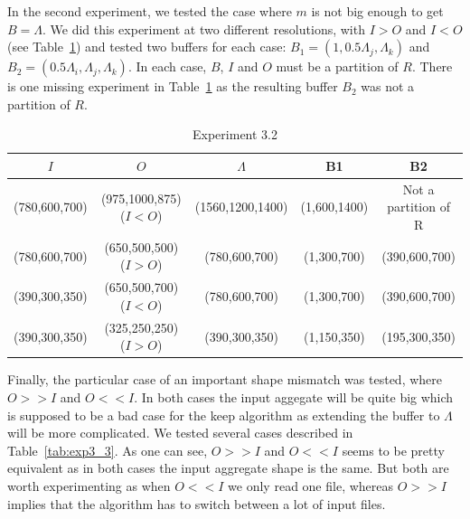 \documentclass[conference]{IEEEtran}
\begin{document}
In the second experiment, we tested the case where $m$ is not big enough to get
$B=\Lambda$. We did this experiment at two different resolutions, with $I>O$
and $I<O$ (see Table~\ref{tab:exp3_2}) and tested two buffers for each case:
$B_1=(1,0.5\Lambda_j,\Lambda_k)$ and $B_2=(0.5\Lambda_i,\Lambda_j,\Lambda_k)$.
In each case, $B$, $I$ and $O$ must be a partition of $R$. There is one missing
experiment in Table~\ref{tab:exp3_2} as the resulting buffer $B_2$ was not a
partition of $R$.

\begin{table}[ht]
 \centering
 \caption{Experiment 3.2}

  \begin{tabular}[t]{c c c c c}
  \hline
    $I$ & $O$ & $\Lambda$ & B1 & B2 \\
    \hline\hline
    (780,600,700) & (975,1000,875) ($I<O$) & (1560,1200,1400) & (1,600,1400) & Not a partition of R \\
    \hline
    (780,600,700) & (650,500,500) ($I>O$) & (780,600,700) & (1,300,700) & (390,600,700) \\
    \hline
    (390,300,350) & (650,500,700) ($I<O$) & (780,600,700) & (1,300,700) & (390,600,700) \\
    \hline
    (390,300,350) & (325,250,250) ($I>O$) & (390,300,350) & (1,150,350) & (195,300,350) \\
    \hline
  \end{tabular}
  \label{tab:exp3_2}
\end{table}

Finally, the particular case of an important shape mismatch was tested, where
$O>>I$ and $O<<I$. In both cases the input aggegate will be quite big which is
supposed to be a bad case for the keep algorithm as extending the buffer to
$\Lambda$ will be more complicated. We tested several cases described in
Table~\ref{tab:exp3_3}. As one can see, $O>>I$ and $O<<I$ seems to be pretty
equivalent as in both cases the input aggregate shape is the same. But both are
worth experimenting as when $O<<I$ we only read one file, whereas $O>>I$ implies
that the algorithm has to switch between a lot of input files.
\end{document}
